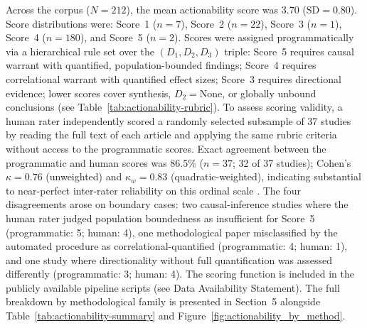 \documentclass{ieeeaccess}
\begin{document}
Across the corpus ($N = 212$), the mean actionability score was $3.70$ ($\mathrm{SD} = 0.80$). Score distributions were: Score~1 ($n = 7$), Score~2 ($n = 22$), Score~3 ($n = 1$), Score~4 ($n = 180$), and Score~5 ($n = 2$). Scores were assigned programmatically via a hierarchical rule set over the $(D_1, D_2, D_3)$ triple: Score~5 requires causal warrant with quantified, population-bounded findings; Score~4 requires correlational warrant with quantified effect sizes; Score~3 requires directional evidence; lower scores cover synthesis, $D_2 = \text{None}$, or globally unbound conclusions (see Table~\ref{tab:actionability-rubric}). To assess scoring validity, a human rater independently scored a randomly selected subsample of 37 studies by reading the full text of each article and applying the same rubric criteria without access to the programmatic scores. Exact agreement between the programmatic and human scores was 86.5\% ($n = 37$; 32 of 37 studies); Cohen's $\kappa = 0.76$ (unweighted) and $\kappa_w = 0.83$ (quadratic-weighted), indicating substantial to near-perfect inter-rater reliability on this ordinal scale \cite{landis1977}. The four disagreements arose on boundary cases: two causal-inference studies where the human rater judged population boundedness as insufficient for Score~5 (programmatic: 5; human: 4), one methodological paper misclassified by the automated procedure as correlational-quantified (programmatic: 4; human: 1), and one study where directionality without full quantification was assessed differently (programmatic: 3; human: 4). The scoring function is included in the publicly available pipeline scripts (see Data Availability Statement). The full breakdown by methodological family is presented in Section~5 alongside Table~\ref{tab:actionability-summary} and Figure~\ref{fig:actionability_by_method}.
\end{document}
